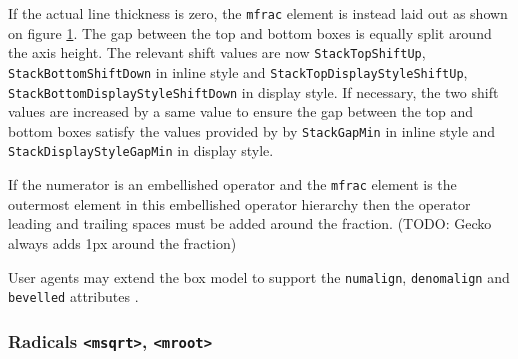 If the actual line thickness is zero,
the {\tt mfrac} element is instead laid out as
shown on figure \ref{StackBoxModel}. The gap between the top and bottom boxes
is equally split around the axis height. The relevant shift values are now
{\tt StackTopShiftUp},
{\tt StackBottomShiftDown} in inline style and
{\tt StackTopDisplayStyleShiftUp},
{\tt StackBottomDisplayStyleShiftDown} in display style.
If necessary, the two shift values are increased by a same value to ensure
the gap between the top and bottom boxes satisfy the values provided by
by {\tt StackGapMin} in inline style and
{\tt StackDisplayStyleGapMin} in display style.

\begin{figure}
\centering
{}
\label{StackBoxModel}
\end{figure}

If the numerator is an embellished operator and the {\tt mfrac} element is the
outermost element in this embellished operator hierarchy then the operator
leading and trailing spaces must be added around the fraction.
(TODO: Gecko always adds 1px around the fraction)

User agents may extend the box model to support the {\tt numalign},
{\tt denomalign} and {\tt bevelled} attributes \cite{MathML3}.

\subsubsection{Radicals {\tt <msqrt>}, {\tt <mroot>}}

